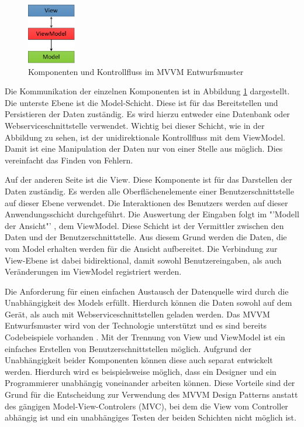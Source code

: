 \begin{figure}
\centering
\includegraphics[height=100px]{images/mvvm}
\caption{Komponenten und Kontrollfluss im MVVM Entwurfsmuster}
\label{mvvm}
\end{figure}
Die Kommunikation der einzelnen Komponenten ist in Abbildung \ref{mvvm} dargestellt. Die unterste Ebene ist die Model-Schicht. Diese ist für das Bereitstellen und Persistieren der Daten zuständig. Es wird hierzu entweder eine Datenbank oder Webserviceschnittstelle verwendet. Wichtig bei dieser Schicht, wie in der Abbildung zu sehen, ist der unidirektionale Kontrollfluss mit dem ViewModel. Damit ist eine Manipulation der Daten nur von einer Stelle aus möglich. Dies vereinfacht das Finden von Fehlern. \par
Auf der anderen Seite ist die View. Diese Komponente ist für das Darstellen der Daten zuständig. Es werden alle Oberflächenelemente einer Benutzerschnittstelle auf dieser Ebene verwendet. Die Interaktionen des Benutzers werden auf dieser Anwendungsschicht durchgeführt. Die Auswertung der Eingaben folgt im "'Modell der Ansicht"' \cite[S.9]{bib:mvvm}, dem ViewModel. Diese Schicht ist der Vermittler zwischen den Daten und der Benutzerschnittstelle. Aus diesem Grund werden die Daten, die vom Model erhalten werden für die Ansicht aufbereitet. Die Verbindung zur View-Ebene ist dabei bidirektional, damit sowohl Benutzereingaben, als auch Veränderungen im ViewModel registriert werden. \par

Die Anforderung für einen einfachen Austausch der Datenquelle wird durch die Unabhängigkeit des Models erfüllt. Hierdurch können die Daten sowohl auf dem Gerät, als auch mit Webserviceschnittstellen geladen werden. Das MVVM Entwurfsmuster wird von der Technologie unterstützt und es sind bereits Codebeispiele vorhanden \cite{bib:winMvvm}. Mit der Trennung von View und ViewModel ist ein einfaches Erstellen von Benutzerschnittstellen möglich. Aufgrund der Unabhängigkeit beider Komponenten können diese auch separat entwickelt werden. Hierdurch wird es beispielsweise möglich, dass ein Designer und ein Programmierer unabhängig voneinander arbeiten können. Diese Vorteile sind der Grund für die Entscheidung zur Verwendung des MVVM Design Patterns anstatt des gängigen Model-View-Controlers (MVC), bei dem die View vom Controller abhängig ist und ein unabhängiges Testen der beiden Schichten nicht möglich ist.

